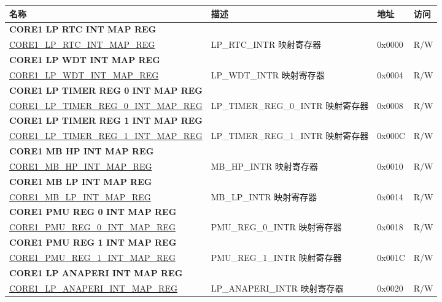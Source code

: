 \begin{longtable}{ | p{7.5cm} | p{7.2cm} | p{1.3cm} | p{1cm} | }
\hline\rowcolor{lightgray}
名称 & 描述 &  地址 & 访问 \\ \hline
\endhead
\multicolumn{4}{|l|}{\textbf{CORE1 LP RTC INT MAP REG}} \\ \hline
\hyperref[regdesc:CORE1LPRTCINTMAPREG]{CORE1\_LP\_RTC\_INT\_MAP\_REG} & LP\_RTC\_INTR 映射寄存器 & 0x0000 & R/W \\ \hline
\multicolumn{4}{|l|}{\textbf{CORE1 LP WDT INT MAP REG}} \\ \hline
\hyperref[regdesc:CORE1LPWDTINTMAPREG]{CORE1\_LP\_WDT\_INT\_MAP\_REG} & LP\_WDT\_INTR 映射寄存器 & 0x0004 & R/W \\ \hline
\multicolumn{4}{|l|}{\textbf{CORE1 LP TIMER REG 0 INT MAP REG}} \\ \hline
\hyperref[regdesc:CORE1LPTIMERREG0INTMAPREG]{CORE1\_LP\_TIMER\_REG\_0\_INT\_MAP\_REG} & LP\_TIMER\_REG\_0\_INTR 映射寄存器 & 0x0008 & R/W \\ \hline
\multicolumn{4}{|l|}{\textbf{CORE1 LP TIMER REG 1 INT MAP REG}} \\ \hline
\hyperref[regdesc:CORE1LPTIMERREG1INTMAPREG]{CORE1\_LP\_TIMER\_REG\_1\_INT\_MAP\_REG} & LP\_TIMER\_REG\_1\_INTR 映射寄存器 & 0x000C & R/W \\ \hline
\multicolumn{4}{|l|}{\textbf{CORE1 MB HP INT MAP REG}} \\ \hline
\hyperref[regdesc:CORE1MBHPINTMAPREG]{CORE1\_MB\_HP\_INT\_MAP\_REG} & MB\_HP\_INTR 映射寄存器 & 0x0010 & R/W \\ \hline
\multicolumn{4}{|l|}{\textbf{CORE1 MB LP INT MAP REG}} \\ \hline
\hyperref[regdesc:CORE1MBLPINTMAPREG]{CORE1\_MB\_LP\_INT\_MAP\_REG} & MB\_LP\_INTR 映射寄存器 & 0x0014 & R/W \\ \hline
\multicolumn{4}{|l|}{\textbf{CORE1 PMU REG 0 INT MAP REG}} \\ \hline
\hyperref[regdesc:CORE1PMUREG0INTMAPREG]{CORE1\_PMU\_REG\_0\_INT\_MAP\_REG} & PMU\_REG\_0\_INTR 映射寄存器 & 0x0018 & R/W \\ \hline
\multicolumn{4}{|l|}{\textbf{CORE1 PMU REG 1 INT MAP REG}} \\ \hline
\hyperref[regdesc:CORE1PMUREG1INTMAPREG]{CORE1\_PMU\_REG\_1\_INT\_MAP\_REG} & PMU\_REG\_1\_INTR 映射寄存器 & 0x001C & R/W \\ \hline
\multicolumn{4}{|l|}{\textbf{CORE1 LP ANAPERI INT MAP REG}} \\ \hline
\hyperref[regdesc:CORE1LPANAPERIINTMAPREG]{CORE1\_LP\_ANAPERI\_INT\_MAP\_REG} & LP\_ANAPERI\_INTR 映射寄存器 & 0x0020 & R/W \\ \hline

\end{longtable}
